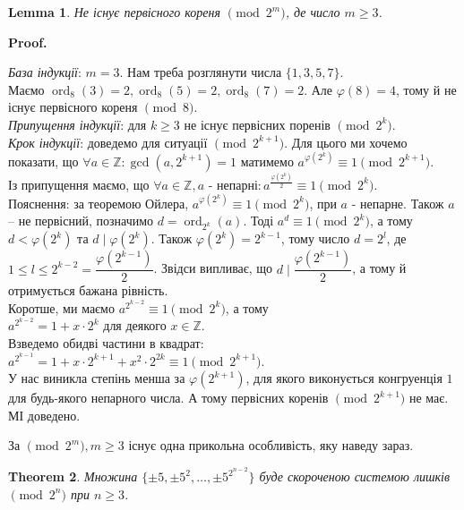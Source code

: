 \documentclass[a4paper, 14pt]{extarticle}
\makeatletter
\theoremstyle{theoremdd}
\newtheorem{theorem}{Theorem}[subsection]
\theoremstyle{theoremdd}
\theoremstyle{theoremdd}
\theoremstyle{theoremdd}
\theoremstyle{theoremdd}
\theoremstyle{theoremdd}
\theoremstyle{theoremdd}
\newtheorem{lemma}[theorem]{Lemma}
\theoremstyle{theoremdd}
\def\qed{$\blacksquare$}
\renewenvironment{proof}[1][Proof.\\]{\par
\pushQED{\hfill \qed}%
\normalfont \topsep6\p@\@plus6\p@\relax
\trivlist
\item\relax
{\bfseries
#1\@addpunct{.}}\hspace\labelsep\ignorespaces
}{%
\popQED\endtrivlist\@endpefalse
}
\DeclareMathOperator{\ord}{ord}
\makeatother
\begin{document}
\begin{lemma}
Не існує первісного кореня $\!\! \pmod {2^m}$, де число $m \geq 3$.
\end{lemma}

\begin{proof}
\textit{База індукції}: $m = 3$. Нам треба розглянути числа $\{1,3,5,7\}$. \\
Маємо $\ord_8 (3) = 2, \ord_8 (5) = 2, \ord_8 (7) = 2$. Але $\varphi(8) = 4$, тому й не існує первісного кореня $\pmod 8$.\\
\textit{Припущення індукції}: для $k \geq 3$ не існує первісних поренів $\pmod {2^k}$.\\
\textit{Крок індукції}: доведемо для ситуації $\pmod {2^{k+1}}$. Для цього ми хочемо показати, що $\forall a \in \mathbb{Z}: \gcd(a,2^{k+1}) = 1$ матимемо $a^{\varphi(2^k)} \equiv 1 \pmod {2^{k+1}}$.\\
Із припущення маємо, що $\forall a \in \mathbb{Z}, a \text{ - непарні}: a^{\frac{\varphi(2^k)}{2}} \equiv 1 \pmod {2^k}$.\\
Пояснення: за теоремою Ойлера, $a^{\varphi(2^k)} \equiv 1 \pmod {2^k}$, при $a$ - непарне. Також $a$ -- не первісний, позначимо $d = \ord_{2^k}(a)$. Тоді $a^d \equiv 1 \pmod {2^k}$, а тому $d < \varphi(2^k)$ та $d \mid \varphi(2^k)$. Також $\varphi(2^k) = 2^{k-1}$, тому число $d = 2^l$, де $1 \leq l \leq 2^{k-2} = \dfrac{\varphi(2^{k-1})}{2}$. Звідси випливає, що $d \mid \dfrac{\varphi(2^{k-1})}{2}$, а тому й отримується бажана рівність.\\
Коротше, ми маємо $a^{2^{k-2}} \equiv 1 \pmod {2^k}$, а тому \\
$a^{2^{k-2}} = 1 + x \cdot 2^k$ для деякого $x \in \mathbb{Z}$.\\
Взведемо обидві частини в квадрат:\\
$a^{2^{k-1}} = 1 + x \cdot 2^{k+1} + x^2 \cdot 2^{2k} \equiv 1 \pmod {2^{k+1}}$.\\
У нас виникла степінь менша за $\varphi(2^{k+1})$, для якого виконується конгруенція $1$ для будь-якого непарного числа. А тому первісних коренів $\pmod {2^{k+1}}$ не має.\\
МІ доведено.
\end{proof}

За $\!\!\pmod {2^m}, m \geq 3$ існує одна прикольна особливість, яку наведу зараз.

\begin{theorem}
Множина $\{\pm 5, \pm 5^2, \dots, \pm 5^{2^{n-2}}\}$ буде скороченою системою лишків $\!\! \pmod {2^n}$ при $n \geq 3$.
\end{theorem}
\end{document}
